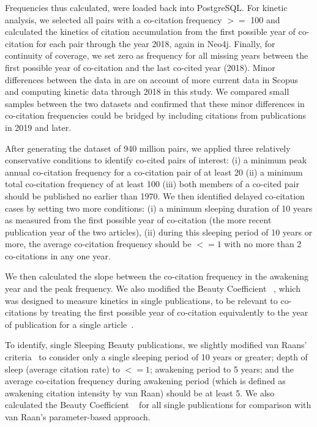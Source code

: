 \documentclass[utf8]{frontiersSCNS}
\begin{document}
Frequencies thus calculated, were loaded back into PostgreSQL. For kinetic analysis, we selected all pairs with a co-citation frequency $>=$ 100 and calculated the kinetics of citation accumulation from the first possible year of co-citation for each pair through the year 2018, again in Neo4j.  Finally, for continuity of coverage, we set zero as frequency for all missing years between the first possible year of co-citation and the last co-cited year (2018). Minor differences between the data in  \cite{devarakonda_2020} are on account of more current data in Scopus and computing kinetic data through 2018 in this study. We compared small samples between the two datasets and confirmed that these minor differences in co-citation frequencies could be bridged by including citations from publications in 2019 and later. 

After generating the dataset of 940 million pairs, we applied three relatively conservative conditions to identify co-cited pairs of interest: (i) a minimum peak annual co-citation frequency for a co-citation pair of at least 20 (ii) a minimum total co-citation frequency of at least 100 (iii) both members of a co-cited pair should be published no earlier than 1970. We then identified delayed co-citation cases by setting two more conditions: (i) a minimum sleeping duration of 10 years as measured from the first possible year of co-citation (the more recent publication year of the two articles), (ii) during this sleeping period of 10 years or more, the average co-citation frequency should be $<= 1$ with no more than 2 co-citations in any one year. 

We then calculated the slope between the co-citation frequency in the awakening year and the peak frequency. We also modified the Beauty Coefficient ~\citep{Ke2015}, which was designed to measure kinetics in single publications, to be relevant to co-citations by treating the first possible year of co-citation equivalently to the year of publication for a single article~\citep{devarakonda_2020}. 

To identify, single Sleeping Beauty publications, we slightly modified van Raans' criteria~\cite{Raan2019} to consider only a single sleeping period of 10 years or greater; depth of sleep (average citation rate) to $<= 1$; awakening period to 5 years; and the average co-citation frequency during awakening period (which is defined as awakening citation intensity by van Raan) should be at least 5. We also calculated the Beauty Coefficient ~\citep{Ke2015} for all single publications for comparison with van Raan's parameter-based approach.
\end{document}
